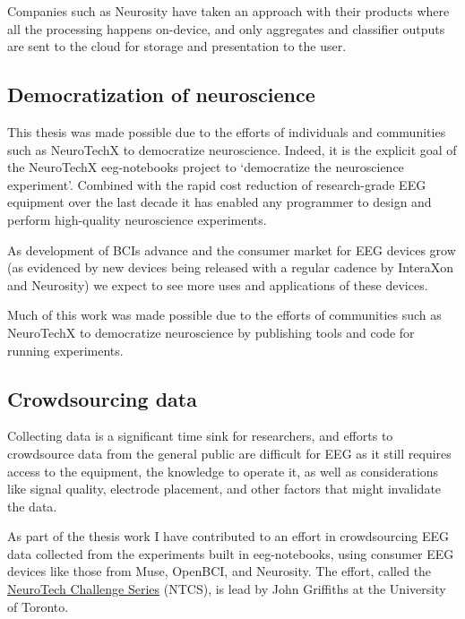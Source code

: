     Companies such as Neurosity have taken an approach with their products where all the processing happens on-device, and only aggregates and classifier outputs are sent to the cloud for storage and presentation to the user.



\subsection{Democratization of neuroscience}

    This thesis was made possible due to the efforts of individuals and communities such as NeuroTechX to democratize neuroscience. Indeed, it is the explicit goal of the NeuroTechX eeg-notebooks project to `democratize the neuroscience experiment'. Combined with the rapid cost reduction of research-grade EEG equipment over the last decade it has enabled any programmer to design and perform high-quality neuroscience experiments.

    As development of BCIs advance and the consumer market for EEG devices grow (as evidenced by new devices being released with a regular cadence by InteraXon and Neurosity) we expect to see more uses and applications of these devices.

    Much of this work was made possible due to the efforts of communities such as NeuroTechX to democratize neuroscience by publishing tools and code for running experiments.

\subsection{Crowdsourcing data}

    Collecting data is a significant time sink for researchers, and efforts to crowdsource data from the general public are difficult for EEG as it still requires access to the equipment, the knowledge to operate it, as well as considerations like signal quality, electrode placement, and other factors that might invalidate the data.

    As part of the thesis work I have contributed to an effort in crowdsourcing EEG data collected from the experiments built in eeg-notebooks, using consumer EEG devices like those from Muse, OpenBCI, and Neurosity\@. The effort, called the \href{https://neurotech-challenge.com/}{NeuroTech Challenge Series} (NTCS), is lead by John Griffiths at the University of Toronto.

